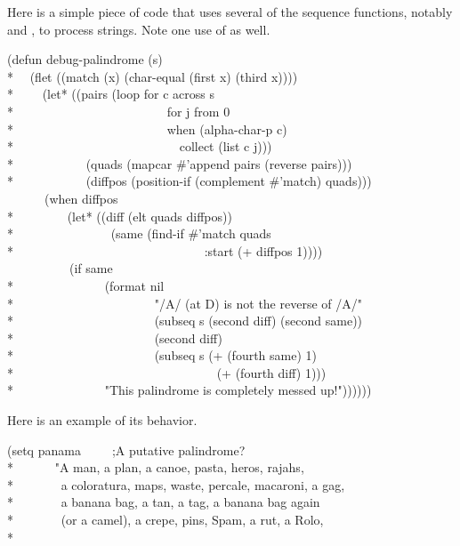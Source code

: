 \begin{newer}
Here is a simple piece of code that uses several of the sequence
functions, notably  and ,
to process strings.  Note one use of  as well.
\begin{lisp}
(defun debug-palindrome (s) \\*
~~(flet ((match (x) (char-equal (first x) (third x)))) \\*
~~~~(let* ((pairs (loop for c across s \\*
~~~~~~~~~~~~~~~~~~~~~~~~for j from 0 \\*
~~~~~~~~~~~~~~~~~~~~~~~~when (alpha-char-p c) \\*
~~~~~~~~~~~~~~~~~~~~~~~~~~collect (list c j))) \\*
~~~~~~~~~~~(quads (mapcar \#'append pairs (reverse pairs))) \\*
~~~~~~~~~~~(diffpos (position-if (complement \#'match) quads))) \\
~~~~~~(when diffpos \\*
~~~~~~~~(let* ((diff (elt quads diffpos)) \\*
~~~~~~~~~~~~~~~(same (find-if \#'match quads \\*
~~~~~~~~~~~~~~~~~~~~~~~~~~~~~~:start (+ diffpos 1)))) \\
~~~~~~~~~~(if same \\*
~~~~~~~~~~~~~~(format nil \\*
~~~~~~~~~~~~~~~~~~~~~~"/{\Xtilde}A/ (at {\Xtilde}D) is not the reverse of /{\Xtilde}A/" \\*
~~~~~~~~~~~~~~~~~~~~~~(subseq s (second diff) (second same)) \\*
~~~~~~~~~~~~~~~~~~~~~~(second diff) \\*
~~~~~~~~~~~~~~~~~~~~~~(subseq s (+ (fourth same) 1) \\*
~~~~~~~~~~~~~~~~~~~~~~~~~~~~~~~~(+ (fourth diff) 1))) \\*
~~~~~~~~~~~~~~"This palindrome is completely messed up!"))))))
\end{lisp}
Here is an example of its behavior.
\begin{lisp}
(setq panama~~~~~;\textrm{A putative palindrome?} \\*
~~~~~~"A man, a plan, a canoe, pasta, heros, rajahs, \\*
~~~~~~~a coloratura, maps, waste, percale, macaroni, a gag, \\*
~~~~~~~a banana bag, a tan, a tag, a banana bag again \\*
~~~~~~~(or a camel), a crepe, pins, Spam, a rut, a Rolo, \\*

\end{lisp}
\end{newer}
